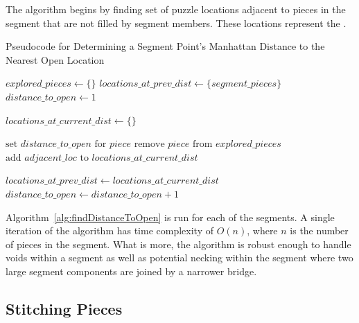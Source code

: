 The algorithm begins by finding set of puzzle locations adjacent to pieces in the segment that are not filled by segment members.  These locations represent the .

\begin{algorithm}
\caption{Pseudocode for Determining a Segment Point's Manhattan Distance to the Nearest Open Location}\label{alg:findDistanceToOpen}
\begin{algorithmic}[1]
    \State $\textit{explored\_pieces} \gets \{ \}$
    \State $\textit{locations\_at\_prev\_dist} \gets \{ \textit{segment\_pieces} \}$
    \State $\textit{distance\_to\_open} \gets 1$
\item[]
        \State $\textit{locations\_at\_current\_dist} \gets \{ \}$
\item[]
        		
        			\State $\text{set } \textit{distance\_to\_open} \text{ for } \textit{piece}$
        			\State $\text{remove } \textit{piece} \text{ from } \textit{explored\_pieces}$
        			\State $\text{add } \textit{adjacent\_loc} \text{ to } \textit{locations\_at\_current\_dist}$
        		\EndIf
        	\EndFor
        \EndFor
\item[]
    \State $\textit{locations\_at\_prev\_dist} \gets locations\_at\_current\_dist$
    \State $\textit{distance\_to\_open} \gets \textit{distance\_to\_open} + 1$
    \EndWhile
\EndProcedure
\end{algorithmic}
\end{algorithm}

Algorithm~\ref{alg:findDistanceToOpen} is run for each of the segments.  A single iteration of the algorithm has time complexity of $O(n)$, where $n$ is the number of pieces in the segment.  What is more, the algorithm is robust enough to handle voids within a segment as well as potential necking within the segment where two large segment components are joined by a narrower bridge.

\subsection{Stitching Pieces}

